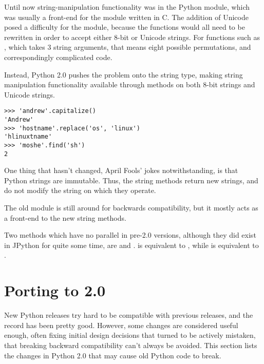 \documentclass{howto}
\begin{document}
Until now string-manipulation functionality was in the 
Python module, which was usually a front-end for the 
module written in C.  The addition of Unicode posed a difficulty for
the  module, because the functions would all need to be
rewritten in order to accept either 8-bit or Unicode strings.  For
functions such as , which takes 3 string
arguments, that means eight possible permutations, and correspondingly
complicated code.

Instead, Python 2.0 pushes the problem onto the string type, making
string manipulation functionality available through methods on both
8-bit strings and Unicode strings.  

\begin{verbatim}
>>> 'andrew'.capitalize()
'Andrew'
>>> 'hostname'.replace('os', 'linux')
'hlinuxtname'
>>> 'moshe'.find('sh')
2
\end{verbatim}

One thing that hasn't changed, April Fools' jokes notwithstanding, is
that Python strings are immutable. Thus, the string methods return new
strings, and do not modify the string on which they operate.

The old  module is still around for backwards
compatibility, but it mostly acts as a front-end to the new string
methods.

Two methods which have no parallel in pre-2.0 versions, although they
did exist in JPython for quite some time, are 
and .   is equivalent to , while  is equivalent to .


\section{Porting to 2.0}

New Python releases try hard to be compatible with previous releases,
and the record has been pretty good.  However, some changes are
considered useful enough, often fixing initial design decisions that
turned to be actively mistaken, that breaking backward compatibility
can't always be avoided.  This section lists the changes in Python 2.0
that may cause old Python code to break.
\end{document}
